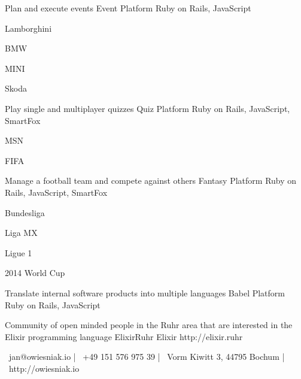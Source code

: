 \documentclass[]{awesome-cv}
\begin{document}
\begin{cventries}
	\cventry
	{Plan and execute events}
	{Event Platform}
	{Ruby on Rails, JavaScript}
	{}
	{\begin{cvitems}
		\item {Lamborghini}
		\item {BMW}
		\item {MINI}
		\item {Skoda}
	\end{cvitems}}
	
	\vspace{-2mm}
	\cventry
	{Play single and multiplayer quizzes}
	{Quiz Platform}
	{Ruby on Rails, JavaScript, SmartFox}
	{}
	{\begin{cvitems}
		\item {MSN}
		\item {FIFA}
	\end{cvitems}}
	
	\vspace{-2mm}
	\cventry
	{Manage a football team and compete against others}
	{Fantasy Platform}
	{Ruby on Rails, JavaScript, SmartFox}
	{}
	{\begin{cvitems}
		\item {Bundesliga}
		\item {Liga MX}
		\item {Ligue 1}
		\item {2014 World Cup}
	\end{cvitems}}
	
	\vspace{-2mm}
	\cventry
	{Translate internal software products into multiple languages}
	{Babel Platform}
	{Ruby on Rails, JavaScript}
	{}
	{}
	
	\vspace{-2mm}
	\cventry
	{Community of open minded people in the Ruhr area that are interested in the Elixir programming language}
	{ElixirRuhr}
	{Elixir}
	{http://elixir.ruhr}
	{}
\end{cventries}
    
 \begin{center}
	\vspace{\fill}
	{\faEnvelope\ jan@owiesniak.io} | {\faMobile\ +49 151 576 975 39} | {\faMapMarker\ Vorm Kiwitt 3, 44795 Bochum} | {\faLink\ http://owiesniak.io}
\end{center}
\ 
\end{document}
